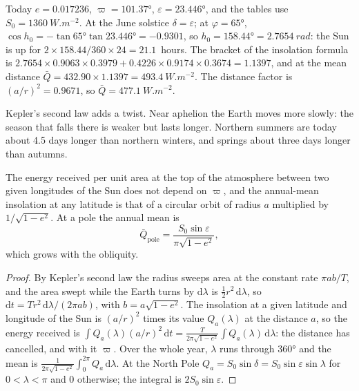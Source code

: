 \begin{example}\label{ex:b2:orbital-forcing:today}
Today $e = 0.017236$, $\varpi = \ang{101.37}$, $\varepsilon = \ang{23.446}$, and the tables use
$S_0 = \qty{1360}{W.m^{-2}}$. At the June solstice $\delta = \varepsilon$; at $\varphi =
\ang{65}$, $\cos h_0 = -\tan\ang{65}\tan\ang{23.446} = -0.9301$, so $h_0 = \ang{158.44} =
\qty{2.7654}{rad}$: the Sun is up for $2 \times 158.44/360 \times 24 = 21.1$~hours. The bracket of
the insolation formula is $2.7654 \times 0.9063 \times 0.3979 + 0.4226 \times 0.9174 \times 0.3674 =
1.1397$, and at the mean distance $\bar Q = 432.90 \times 1.1397 = \qty{493.4}{W.m^{-2}}$. The
distance factor is $(a/r)^2 = 0.9671$, so $\bar Q = \qty{477.1}{W.m^{-2}}$.
\end{example}

Kepler's second law adds a twist. Near aphelion the Earth moves more slowly: the season that falls
there is weaker but lasts longer. Northern summers are today about 4.5 days longer than northern
winters, and springs about three days longer than autumns.

\begin{proposition}\label{prop:b2:orbital-forcing:annual}
The energy received per unit area at the top of the atmosphere between two given longitudes of
the Sun does not depend on $\varpi$, and the annual-mean insolation at any latitude is that of a
circular orbit of radius $a$ multiplied by $1/\sqrt{1 - e^2}$. At a pole the annual mean is
\[
  \bar Q_{\text{pole}} = \frac{S_0\sin\varepsilon}{\pi\sqrt{1 - e^2}} ,
\]
which grows with the obliquity.
\end{proposition}

\begin{proof}
By Kepler's second law the radius sweeps area at the constant rate $\pi ab/T$, and the area swept
while the Earth turns by $\mathrm d\lambda$ is $\frac12 r^2\,\mathrm d\lambda$, so $\mathrm dt =
T r^2\,\mathrm d\lambda/(2\pi ab)$, with $b = a\sqrt{1 - e^2}$. The insolation at a given latitude
and longitude of the Sun is $(a/r)^2$ times its value $Q_a(\lambda)$ at the distance $a$, so the
energy received is $\int Q_a(\lambda)(a/r)^2\,\mathrm dt = \frac{T}{2\pi\sqrt{1 - e^2}}\int
Q_a(\lambda)\,\mathrm d\lambda$: the distance has cancelled, and with it $\varpi$. Over the whole
year, $\lambda$ runs through \ang{360} and the mean is $\frac{1}{2\pi\sqrt{1-e^2}}\int_0^{2\pi}
Q_a\,\mathrm d\lambda$. At the North Pole $Q_a = S_0\sin\delta = S_0\sin\varepsilon\sin\lambda$
for $0 < \lambda < \pi$ and 0 otherwise; the integral is $2S_0\sin\varepsilon$.
\end{proof}

